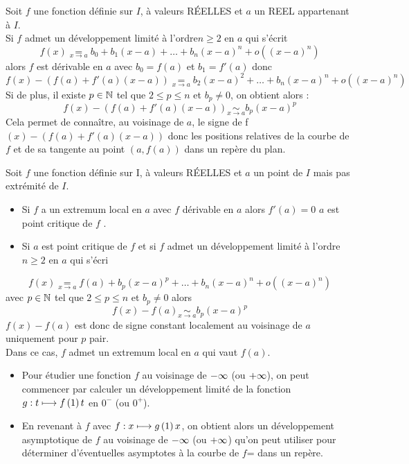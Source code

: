 \begin{defprop}
    Soit \(f\) une fonction définie sur \(I\), à valeurs RÉELLES et \(a\) un REEL appartenant à \(I\).\\
    Si \(f\) admet un développement limité à l’ordre\( n \geq 2\) en \(a\) qui s’écrit
    \[f (x) \underset{x\to a}{=} b_0 + b_1 (x - a) + \dots + b_n (x - a)^n + o ((x - a)^n)\]
    alors \(f\) est dérivable en \(a\) avec \(b_0 = f (a)\) et \(b_1 = f '(a)\) donc 
    \[f (x) - (f (a) + f '(a) (x - a)) \underset{x\to a}{=} b_2 (x - a)^2 + \dots + b_n (x - a)^n + o ((x - a)^n)\]
    Si de plus, il existe \(p \in  \mathbb{N}\) tel que \(2 \leq p \leq n\) et \(b_p\neq 0\), on obtient alors :
    \[f (x) - (f (a) + f '(a) (x - a)) \underset{x \to a}{\sim} b_p(x - a)^p\]
    Cela permet de connaître, au voisinage de \(a\), le signe de f\( (x)-(f (a) + f '(a) (x - a))\) donc les positions relatives de la courbe de \(f\) et de sa tangente au point \((a, f (a))\) dans un repère du plan.
\end{defprop}

\begin{defprop}
    Soit \(f\) une fonction définie sur \(\)I, à valeurs RÉELLES et \(a\) un point de \(I\) mais pas extrémité de \(I\).
    \begin{itemize}
        \item Si \(f\) a un extremum local en \(a\) avec \(f\) dérivable en \(a\) alors \(f '(a) = 0\) \ie \(a\) est point critique de \(f\) .        
        \item Si \(a\) est point critique de \(f\) et si \(f\) admet un développement limité à l’ordre \(n \geq 2\) en \(a\) qui s’écri
    \end{itemize}
    \[f (x) \underset{x\to a}{=} f (a) + b_p (x - a)^p + \dots + b_n (x - a)^n + o ((x - a)^n)\]
    avec \(p \in  \mathbb{N}\) tel que \(2 \leq p \leq n\) et \(b_p\neq 0\) alors
    \[f (x) - f (a) \underset{x \to a}{\sim} b_p(x - a)^p\]
    \(f (x) - f (a)\) est donc de signe constant localement au voisinage de \(a\) uniquement pour \(p\) pair.\\
    Dans ce cas, \(f\) admet un extremum local en \(a\) qui vaut \(f (a)\).
\end{defprop}

\begin{defprop}
    \begin{itemize}
        \item Pour étudier une fonction \(f\) au voisinage de \(-\infty\) (ou \(+\infty\)), on peut commencer par calculer un développement limité de la fonction \(g : t \longmapsto  f\left(1\right){t}\) en \(0^-\) (ou \(0^+\)).
        \item En revenant à \(f\) avec \(f : x \longmapsto  g\left(1\right){x}\), on obtient alors un développement asymptotique de \(f\) au voisinage de \(-\infty\) (ou \(+\infty\)) qu’on peut utiliser pour déterminer d’éventuelles asymptotes à la courbe de \(f\)= dans un repère.
    \end{itemize}
\end{defprop}
